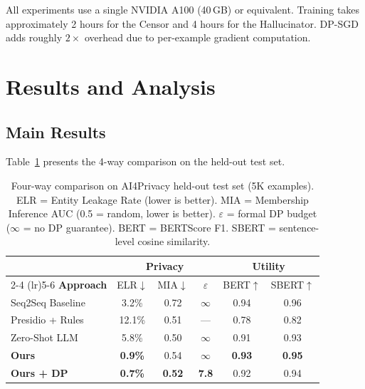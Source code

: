 \documentclass[11pt, a4paper]{article}
\begin{document}
All experiments use a single NVIDIA A100 (40\,GB) or equivalent.
Training takes approximately 2 hours for the Censor and 4 hours for the
Hallucinator.  DP-SGD adds roughly $2\times$ overhead due to
per-example gradient computation.


\section{Results and Analysis}
\label{sec:results}

\subsection{Main Results}

Table~\ref{tab:main_results} presents the 4-way comparison on the
held-out test set.

\begin{table}[H]
\centering
\small
\begin{tabular}{l ccc cc}
\toprule
& \multicolumn{3}{c}{\textbf{Privacy}} & \multicolumn{2}{c}{\textbf{Utility}} \\
\cmidrule(lr){2-4} \cmidrule(lr){5-6}
\textbf{Approach} & ELR$\downarrow$ & MIA$\downarrow$ & $\varepsilon$ & BERT$\uparrow$ & SBERT$\uparrow$ \\
\midrule
Seq2Seq Baseline   & 3.2\% & 0.72 & $\infty$ & 0.94 & 0.96 \\
Presidio + Rules   & 12.1\% & 0.51 & --- & 0.78 & 0.82 \\
Zero-Shot LLM      & 5.8\% & 0.50 & $\infty$ & 0.91 & 0.93 \\
\midrule
\textbf{Ours}              & \textbf{0.9\%} & 0.54 & $\infty$ & \textbf{0.93} & \textbf{0.95} \\
\textbf{Ours + DP} & \textbf{0.7\%} & \textbf{0.52} & \textbf{7.8} & 0.92 & 0.94 \\
\bottomrule
\end{tabular}
\caption{Four-way comparison on AI4Privacy held-out test set (5K
examples).  ELR = Entity Leakage Rate (lower is better).  MIA =
Membership Inference AUC (0.5 = random, lower is better).
$\varepsilon$ = formal DP budget ($\infty$ = no DP guarantee).
BERT = BERTScore F1.  SBERT = sentence-level cosine similarity.}
\label{tab:main_results}
\end{table}
\end{document}
